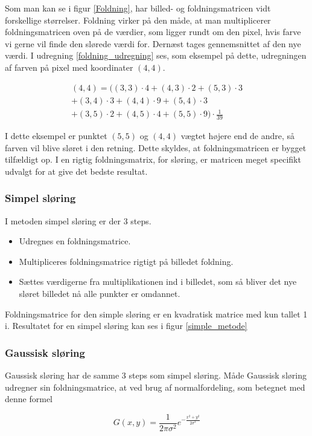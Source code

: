 {Som man kan se i figur \ref{Foldning}, har billed- og foldningsmatricen
vidt forskellige størrelser. Foldning virker på den måde, at man
multiplicerer foldningsmatricen oven på de værdier, som ligger rundt om den pixel,
hvis farve vi gerne vil finde den slørede værdi for. Dernæst tages gennemsnittet af den
nye værdi. I udregning \ref{foldning_udregning} ses, som eksempel på
dette, udregningen af farven på pixel med koordinater $(4,4)$.

\begin{multline}
    (4,4) = ((3,3)\cdot 4+(4,3) \cdot 2+(5,3) \cdot 3\\
    + (3,4) \cdot 3+(4,4) \cdot 9+(5,4) \cdot 3\\
    + (3,5) \cdot 2+(4,5) \cdot 4+(5,5) \cdot 9) \cdot \frac{1}{39}
    \label{foldning_udregning}
\end{multline}

I dette eksempel er punktet $(5,5)$ og $(4,4)$ vægtet højere end de
andre, så farven vil blive sløret i den retning. Dette skyldes, at
foldningsmatricen er bygget tilfældigt op. I en rigtig foldningsmatrix,
for sløring, er matricen meget specifikt udvalgt for at give det bedste
resultat.

\subsubsection*{Simpel sløring}
I metoden simpel sløring er der 3 steps.
\begin{itemize}
	\item{Udregnes en foldningsmatrice.}
	\item{Multipliceres foldningsmatrice rigtigt på billedet foldning.}
	\item{Sættes værdigerne fra multiplikationen ind i billedet, som så bliver det nye sløret billedet nå
alle punkter er omdannet.}
\end{itemize}

Foldningsmatrice for den simple sløring er en kvadratisk matrice med kun
tallet 1 i. Resultatet for en simpel sløring kan ses i figur
\ref{simple_metode}

\subsubsection*{Gaussisk sløring}
Gaussisk sløring har de samme 3 steps som simpel sløring. Måde Gaussisk
sløring udregner sin foldningsmatrice, at ved brug af normalfordeling,
som betegnet med denne formel

\begin{equation}
	G(x,y) = \frac{1}{2\pi\sigma^2}e^{-\frac{x^2+y^2}{2\sigma^2}}
\end{equation}

}
